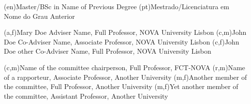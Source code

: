 \ntauthordegree(en){Master/BSc in Name of Previous Degree}
\ntauthordegree(pt){Mestrado/Licenciatura em Nome do Grau Anterior}






(a,f){Mary Doe Adviser Name, Full Professor, NOVA University Lisbon}
(c,m){John Doe Co-Adviser Name, Associate Professor, NOVA University Lisbon}
(c,f){John Doe other Co-Adviser Name, Full Professor, NOVA University Lisbon}



(c,m){Name of the committee chairperson, Full Professor, FCT-NOVA}
(r,m){Name of a rapporteur, Associate Professor, Another University}
(m,f){Another member of the committee, Full Professor, Another University}
(m,f){Yet another member of the committee, Assistant Professor, Another University}
